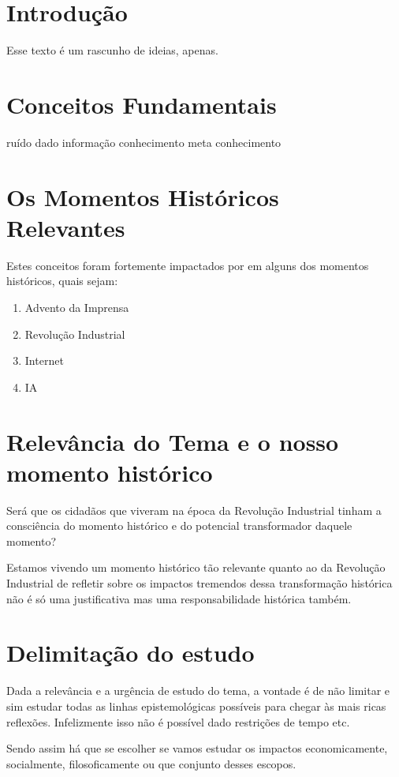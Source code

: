 \documentclass{../../common-shared/cls/Article_Class_RevInfor}
\begin{document}
\textual


\section{Introdução}
Esse texto é um rascunho de ideias, apenas.


\section {Conceitos Fundamentais}
ruído
dado
informação
conhecimento
meta conhecimento

\section {Os Momentos Históricos Relevantes}
Estes conceitos foram fortemente impactados por em alguns dos momentos históricos, quais sejam:

\begin{enumerate}
\item Advento da Imprensa
\item Revolução Industrial
\item Internet
\item IA
\end{enumerate}

\section{Relevância do Tema e o nosso momento histórico}
Será que os cidadãos que viveram na época da Revolução Industrial tinham a consciência do momento histórico e do potencial transformador daquele momento?

Estamos vivendo um momento histórico tão relevante quanto ao da Revolução Industrial de refletir sobre os impactos tremendos dessa transformação histórica não é só uma justificativa mas uma responsabilidade histórica também.

\section{Delimitação do estudo}
Dada a relevância e a urgência de estudo do tema, a vontade é de não limitar e sim estudar todas as linhas epistemológicas possíveis para chegar às mais ricas reflexões. Infelizmente isso não é possível dado restrições de tempo etc.

Sendo assim há que se escolher se vamos estudar os impactos economicamente, socialmente, filosoficamente ou que conjunto desses escopos.
\end{document}
